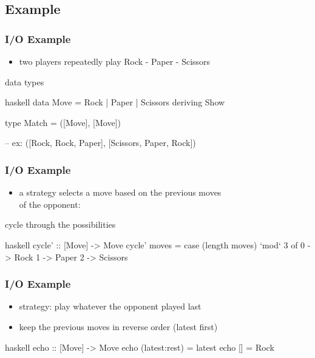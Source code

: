 \documentclass[dvipsnames]{beamer}
\theoremstyle{plain}
\begin{document}
\subsection{Example}

\begin{frame}[fragile]
  \frametitle{I/O Example}

  \begin{itemize}
    \item two players repeatedly play Rock - Paper - Scissors
  \end{itemize}

  \begin{exampleblock}{data types}
    \begin{pygments}{haskell}
data Move = Rock | Paper | Scissors
            deriving Show

type Match = ([Move], [Move])

-- ex: ([Rock, Rock, Paper], [Scissors, Paper, Rock])
    \end{pygments}
  \end{exampleblock}
\end{frame}

\begin{frame}[fragile]
  \frametitle{I/O Example}

  \begin{itemize}
    \item a strategy selects a move based on the previous moves\\
      of the opponent:\\
      \smallskip
  \end{itemize}

  \begin{exampleblock}{cycle through the possibilities}
    \begin{pygments}{haskell}
cycle' :: [Move] -> Move
cycle' moves =
    case (length moves) `mod` 3 of
      0 -> Rock
      1 -> Paper
      2 -> Scissors
    \end{pygments}
  \end{exampleblock}
\end{frame}

\begin{frame}[fragile]
  \frametitle{I/O Example}

  \begin{itemize}
    \item strategy: play whatever the opponent played last
    \item keep the previous moves in reverse order (latest first)
  \end{itemize}

  \begin{exampleblock}{}
    \begin{pygments}{haskell}
echo :: [Move] -> Move
echo (latest:rest) = latest
echo [] = Rock
    \end{pygments}
  \end{exampleblock}
\end{frame}
\end{document}
